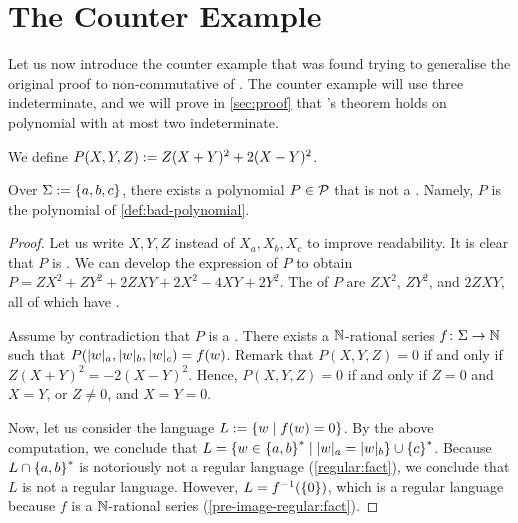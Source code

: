 \documentclass[a4paper,11pt]{article}
\begin{document}
\section{The Counter Example}
\label{sec:c-example}

Let us now introduce the counter example that was found trying to generalise
the original proof to non-commutative  of
. The counter example will use three indeterminate, and
we will prove in \cref{sec:proof} that \citeauthor{KARH77}’s theorem holds on
polynomial with at most two indeterminate.

\begin{definition}
    \label{def:bad-polynomial}
    We define $P(X,Y,Z) \mathrel{:=} Z (X + Y)^2 + 2 (X - Y)^2$.
\end{definition}

\begin{theorem}
    \label{thm:counter-example}
    Over $\Sigma \mathrel{:=} \mathopen{\{} a,b,c \mathclose{\}}$,
    there exists a polynomial $P \in \mathcal{P}$ that is not
    a . Namely,
    $P$ is the polynomial of \cref{def:bad-polynomial}.
\end{theorem}
\begin{proof}
    Let us write $X,Y,Z$ instead of $X_a, X_b, X_c$ to improve
    readability.
    It is clear that $P$ is . We can develop
    the expression of $P$ to 
    obtain
    $P = ZX^2 + ZY^2 + 2ZXY + 2X^2 -4XY + 2Y^2$.
    The  of $P$
    are $ZX^2$, $ZY^2$, and $2ZXY$, all of which have
    .

    Assume by contradiction that $P$ is a .
    There exists a 
    $\mathbb{N}$-rational series $f \colon \Sigma \to \mathbb{N}$
    such that $P(\card[a]{w}, \card[b]{w}, \card[c]{w}) = f(w)$.
    Remark that $P(X,Y,Z) = 0$
    if and only if $Z(X+Y)^2 = -2 (X-Y)^2$. Hence,
    $P(X,Y,Z)=0$ if and only if $Z = 0$ and $X = Y$, or 
    $Z \neq 0$, and $X = Y = 0$.

    Now, let us consider the language $L \mathrel{:=} \mathopen{\{} w \mid  f(w) = 0 \mathclose{\}}$. By the
    above computation, we conclude that $L = \setof{ w \in \set{a,b}^* }{
    \card[a]{w} = \card[b]{w} } \cup \set{ c }^*$.
    Because $L \cap \mathopen{\{} a,b \mathclose{\}}^*$ is notoriously not a regular language
    (\cref{regular:fact}), we
    conclude that $L$ is not a regular language.
    However, $L = f^{-1}(\mathopen{\{} 0 \mathclose{\}})$, which is a regular language
    because $f$ is a $\mathbb{N}$-rational series
    (\cref{pre-image-regular:fact}).
\end{proof}
\end{document}
